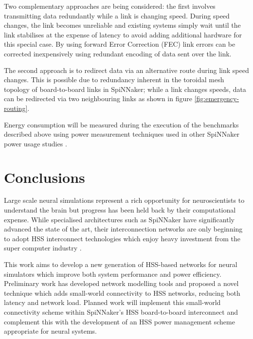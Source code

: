 		Two complementary approaches are being considered: the first involves
		transmitting data redundantly while a link is changing speed. During speed
		changes, the link becomes unreliable and existing systems simply wait until
		the link stabilises at the expense of latency to avoid adding additional
		hardware for this special case. By using forward Error Correction (FEC)
		\cite{hamming50} link errors can be corrected inexpensively using redundant
		encoding of data sent over the link.
		
		The second approach is to redirect data via an alternative route during link
		speed changes. This is possible due to redundancy inherent in the toroidal
		mesh topology of board-to-board links in SpiNNaker; while a link changes
		speeds, data can be redirected via two neighbouring links as shown in figure
		\ref{fig:emergency-routing}.
		
		Energy consumption will be measured during the execution of the benchmarks
		described above using power measurement techniques used in other SpiNNaker
		power usage studies \cite{sharp12,stromatias13}.


\section{Conclusions}
	
	Large scale neural simulations represent a rich opportunity for
	neuroscientists to understand the brain but progress has been  held back by
	their computational expense. While specialised architectures such as SpiNNaker
	have significantly advanced the state of the art, their interconnection
	networks are only beginning to adopt HSS interconnect technologies which enjoy
	heavy investment from the super computer industry \cite{infinibandta}.
	
	This work aims to develop a new generation of HSS-based networks for neural
	simulators which improve both system performance and power efficiency.
	Preliminary work has developed network modelling tools and proposed a novel
	technique which adds small-world connectivity to HSS networks, reducing both
	latency and network load. Planned work will implement this small-world
	connectivity scheme within SpiNNaker's HSS board-to-board interconnect and
	complement this with the development of an HSS power management scheme
	appropriate for neural systems.
